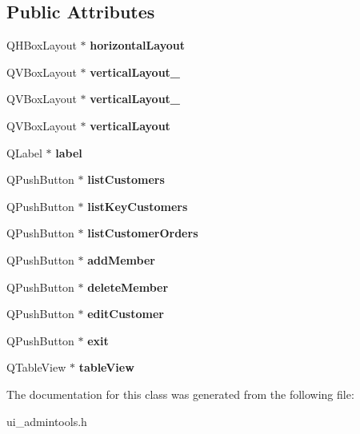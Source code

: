 \subsection*{Public Attributes}
\begin{DoxyCompactItemize}
\item 
\mbox{\label{class_ui__admin_tools_ab9f88d6eda44a4dcb13ee6aca50ba4b3}} 
Q\+H\+Box\+Layout $\ast$ {\bfseries horizontal\+Layout}
\item 
\mbox{\label{class_ui__admin_tools_a0d215568c6f7aa148743ac92200f8df6}} 
Q\+V\+Box\+Layout $\ast$ {\bfseries vertical\+Layout\+\_}
\item 
\mbox{\label{class_ui__admin_tools_a914f1d1b5f8214bbeeb587e380c2f82c}} 
Q\+V\+Box\+Layout $\ast$ {\bfseries vertical\+Layout\+\_}
\item 
\mbox{\label{class_ui__admin_tools_a7e8965e0d0f64e09decd77129a2f1a17}} 
Q\+V\+Box\+Layout $\ast$ {\bfseries vertical\+Layout}
\item 
\mbox{\label{class_ui__admin_tools_a94f670bd7136053108ae581712c7a9fb}} 
Q\+Label $\ast$ {\bfseries label}
\item 
\mbox{\label{class_ui__admin_tools_aa4331cc120cb509fc9022aec73080897}} 
Q\+Push\+Button $\ast$ {\bfseries list\+Customers}
\item 
\mbox{\label{class_ui__admin_tools_a8e396bc2c766b4e37340144c0e9dc4f3}} 
Q\+Push\+Button $\ast$ {\bfseries list\+Key\+Customers}
\item 
\mbox{\label{class_ui__admin_tools_ad04934dabdac7c69f42715457ecbc74b}} 
Q\+Push\+Button $\ast$ {\bfseries list\+Customer\+Orders}
\item 
\mbox{\label{class_ui__admin_tools_aae03a88fca5e8a8c7271129594cb3d25}} 
Q\+Push\+Button $\ast$ {\bfseries add\+Member}
\item 
\mbox{\label{class_ui__admin_tools_a31b411ea282fc3d0f48d2ff50f2b8703}} 
Q\+Push\+Button $\ast$ {\bfseries delete\+Member}
\item 
\mbox{\label{class_ui__admin_tools_a1dfbf183af23b45e361d416e76897bf3}} 
Q\+Push\+Button $\ast$ {\bfseries edit\+Customer}
\item 
\mbox{\label{class_ui__admin_tools_a7b44670d4cce26ba4770a3fb0bb0a122}} 
Q\+Push\+Button $\ast$ {\bfseries exit}
\item 
\mbox{\label{class_ui__admin_tools_a31403bdb494f9d3d62e0f95fceb32ea8}} 
Q\+Table\+View $\ast$ {\bfseries table\+View}
\end{DoxyCompactItemize}


The documentation for this class was generated from the following file\+:\begin{DoxyCompactItemize}
\item 
ui\+\_\+admintools.\+h\end{DoxyCompactItemize}
